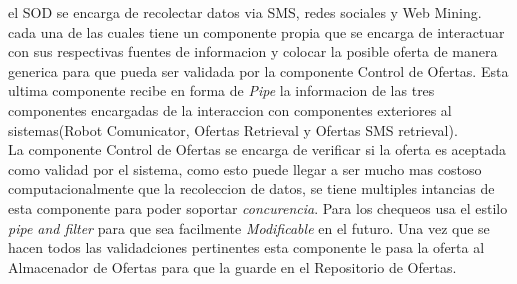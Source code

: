 el SOD se encarga de recolectar datos via SMS, redes sociales y Web Mining. cada una de las cuales tiene un componente propia que se encarga de interactuar con sus respectivas fuentes de informacion y colocar la posible oferta de manera generica para que pueda ser validada por la componente \textsf{Control de Ofertas}. Esta ultima componente recibe en forma de \emph{Pipe} la informacion de las tres componentes encargadas de la interaccion con componentes exteriores al sistemas(\textsf{Robot Comunicator}, \textsf{Ofertas Retrieval} y \textsf{Ofertas SMS retrieval}).\\

La componente Control de Ofertas se encarga de verificar si la oferta es aceptada como validad por el sistema, como esto puede llegar a ser mucho mas costoso computacionalmente que la recoleccion de datos, se tiene multiples intancias de esta componente para poder soportar \emph{concurencia}. Para los chequeos usa el estilo \emph{pipe and filter} para que sea facilmente \emph{Modificable} en el futuro. Una vez que se hacen todos las validadciones pertinentes esta componente le pasa la oferta al \textsf{Almacenador de Ofertas} para que la guarde en el \textsf{Repositorio de Ofertas}.\\





\\
\\
\\

